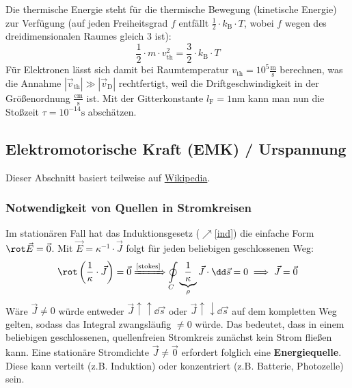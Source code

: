 	   Die thermische Energie steht für die thermische Bewegung (kinetische Energie) zur Verfügung (auf jeden Freiheitsgrad $f$ entfällt $\frac{1}{2} \cdot k_\mathrm{B} \cdot T$, wobei $f$ wegen des dreidimensionalen Raumes gleich 3 ist):
	        \begin{equation*}
	        	\frac{1}{2} \cdot  m \cdot  v_\mathrm{th}^2 = \frac{3}{2} \cdot k_\mathrm{B} \cdot T
	        \end{equation*}
	   Für Elektronen lässt sich damit bei Raumtemperatur $ v_\mathrm{th} = 10^5 \mathrm{\frac{m}{s}}$ berechnen, was die Annahme \(|\vec{v}_\mathrm{th}| \gg |\vec{v}_\mathrm{D}| \) rechtfertigt, weil die Driftgeschwindigkeit in der Größenordnung $\frac{\mathrm{cm}}{\mathrm{s}}$ ist. Mit der Gitterkonstante \(l_\mathrm{F} = 1 \mathrm{nm} \) kann man nun die Stoßzeit
	        $\tau = 10^{-14}\mathrm{s}$ abschätzen.
 \subsection{Elektromotorische Kraft (EMK) / Urspannung}\label{Urspannung}
 Dieser Abschnitt basiert teilweise auf \href{https://de.wikipedia.org/wiki/Elektromotorische_Kraft}{Wikipedia}.
 \subsubsection{Notwendigkeit von Quellen in Stromkreisen}
	   Im stationären Fall hat das Induktionsgesetz ($\nearrow$\ref{ind}) die einfache Form $\rot \vec{E} = \vec{0}$.  Mit \(\vec{E} = \kappa^{-1} \cdot \vec{J} \) folgt für jeden beliebigen geschlossenen Weg:
	        \begin{equation}
		        \rot \left( \dfrac{1}{\kappa} \cdot \vec{J} \right) = \vec{0} \xRightarrow{\text{\ref{stokes}}} \oint\limits_{C} \underbrace{\dfrac{1}{\kappa}}_\rho \vec{J}\cdot \dd\vec{s} = 0 \implies \vec{J} = \vec{0} 
	        \end{equation}
	        Wäre $\vec{J}\neq 0$ würde entweder $\vec{J}\uparrow\uparrow \dd\vec{s}$ oder $\vec{J}\uparrow\downarrow \dd\vec{s}$ auf dem kompletten Weg gelten, sodass das Integral zwangsläufig $\neq 0$ würde. Das bedeutet, dass in einem beliebigen geschlossenen, quellenfreien Stromkreis zunächst kein Strom fließen kann. Eine stationäre Stromdichte \(\vec{J} \ne \vec{0} \) erfordert folglich eine \textbf{Energiequelle}. Diese kann verteilt (z.B. Induktion) oder konzentriert (z.B. Batterie, Photozelle) sein.
